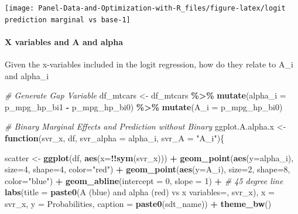 \documentclass[
]{book}
\newenvironment{Shaded}{\begin{snugshade}}{\end{snugshade}}
\newcommand{\CommentTok}[1]{\textcolor[rgb]{0.56,0.35,0.01}{\textit{#1}}}
\newcommand{\ControlFlowTok}[1]{\textcolor[rgb]{0.13,0.29,0.53}{\textbf{#1}}}
\newcommand{\DataTypeTok}[1]{\textcolor[rgb]{0.13,0.29,0.53}{#1}}
\newcommand{\DecValTok}[1]{\textcolor[rgb]{0.00,0.00,0.81}{#1}}
\newcommand{\KeywordTok}[1]{\textcolor[rgb]{0.13,0.29,0.53}{\textbf{#1}}}
\newcommand{\NormalTok}[1]{#1}
\newcommand{\OperatorTok}[1]{\textcolor[rgb]{0.81,0.36,0.00}{\textbf{#1}}}
\newcommand{\StringTok}[1]{\textcolor[rgb]{0.31,0.60,0.02}{#1}}
\begin{document}
\begin{center}\texttt{[image: Panel-Data-and-Optimization-with-R\_files/figure-latex/logit prediction marginal vs base-1]} \end{center}

\hypertarget{x-variables-and-a-and-alpha}{%
\paragraph{X variables and A and alpha}\label{x-variables-and-a-and-alpha}}

Given the x-variables included in the logit regression, how do they relate to A\_i and alpha\_i

\begin{Shaded}
\begin{Highlighting}[]
\CommentTok{\# Generate Gap Variable}
\NormalTok{df\_mtcars \textless{}{-}}\StringTok{ }\NormalTok{df\_mtcars }\OperatorTok{\%\textgreater{}\%}\StringTok{ }\KeywordTok{mutate}\NormalTok{(}\DataTypeTok{alpha\_i =}\NormalTok{ p\_mpg\_hp\_bi1 }\OperatorTok{{-}}\StringTok{ }\NormalTok{p\_mpg\_hp\_bi0) }\OperatorTok{\%\textgreater{}\%}
\StringTok{                }\KeywordTok{mutate}\NormalTok{(}\DataTypeTok{A\_i =}\NormalTok{ p\_mpg\_hp\_bi0)}

\CommentTok{\# Binary Marginal Effects and Prediction without Binary}
\NormalTok{ggplot.A.alpha.x \textless{}{-}}\StringTok{ }\ControlFlowTok{function}\NormalTok{(svr\_x, df,}
                             \DataTypeTok{svr\_alpha =} \StringTok{\textquotesingle{}alpha\_i\textquotesingle{}}\NormalTok{, }\DataTypeTok{svr\_A =} \StringTok{"A\_i"}\NormalTok{)\{}

\NormalTok{  scatter \textless{}{-}}\StringTok{ }\KeywordTok{ggplot}\NormalTok{(df, }\KeywordTok{aes}\NormalTok{(}\DataTypeTok{x=}\OperatorTok{!!}\KeywordTok{sym}\NormalTok{(svr\_x))) }\OperatorTok{+}
\StringTok{        }\KeywordTok{geom\_point}\NormalTok{(}\KeywordTok{aes}\NormalTok{(}\DataTypeTok{y=}\NormalTok{alpha\_i), }\DataTypeTok{size=}\DecValTok{4}\NormalTok{, }\DataTypeTok{shape=}\DecValTok{4}\NormalTok{, }\DataTypeTok{color=}\StringTok{"red"}\NormalTok{) }\OperatorTok{+}
\StringTok{        }\KeywordTok{geom\_point}\NormalTok{(}\KeywordTok{aes}\NormalTok{(}\DataTypeTok{y=}\NormalTok{A\_i), }\DataTypeTok{size=}\DecValTok{2}\NormalTok{, }\DataTypeTok{shape=}\DecValTok{8}\NormalTok{, }\DataTypeTok{color=}\StringTok{"blue"}\NormalTok{) }\OperatorTok{+}
\StringTok{        }\KeywordTok{geom\_abline}\NormalTok{(}\DataTypeTok{intercept =} \DecValTok{0}\NormalTok{, }\DataTypeTok{slope =} \DecValTok{1}\NormalTok{) }\OperatorTok{+}\StringTok{ }\CommentTok{\# 45 degree line}
\StringTok{        }\KeywordTok{labs}\NormalTok{(}\DataTypeTok{title =} \KeywordTok{paste0}\NormalTok{(}\StringTok{\textquotesingle{}A (blue) and alpha (red) vs x variables=\textquotesingle{}}\NormalTok{, svr\_x),}
             \DataTypeTok{x =}\NormalTok{ svr\_x,}
             \DataTypeTok{y =} \StringTok{\textquotesingle{}Probabilities\textquotesingle{}}\NormalTok{,}
             \DataTypeTok{caption =} \KeywordTok{paste0}\NormalTok{(sdt\_name)) }\OperatorTok{+}
\StringTok{        }\KeywordTok{theme\_bw}\NormalTok{()}


\end{Highlighting}
\end{Shaded}
\end{document}
